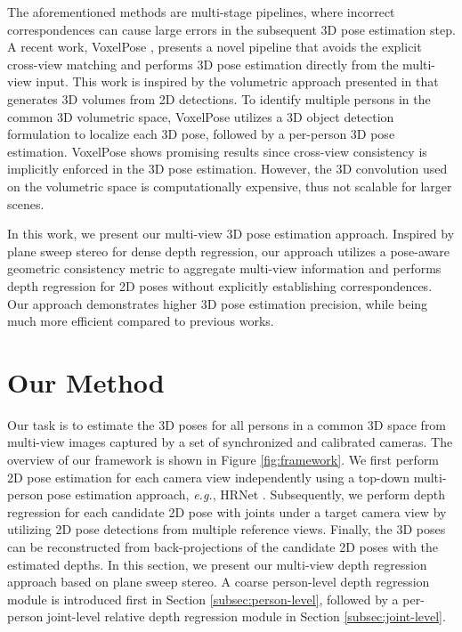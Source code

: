 \documentclass[final]{cvpr}
\begin{document}
The aforementioned methods are multi-stage pipelines, where incorrect correspondences can cause large errors in the subsequent 3D pose estimation step.
A recent work, VoxelPose \cite{tu2020voxelpose}, presents a novel pipeline that avoids the explicit cross-view matching and performs 3D pose estimation directly from the multi-view input. This work is inspired by the volumetric approach presented in \cite{iskakov2019learnable} that generates 3D volumes from 2D detections. To identify multiple persons in the common 3D volumetric space, VoxelPose utilizes a 3D object detection formulation to localize each 3D pose, followed by a per-person 3D pose estimation. VoxelPose shows promising results since cross-view consistency is implicitly enforced in the 3D pose estimation. However, the 3D convolution used on the volumetric space is computationally expensive, thus not scalable for larger scenes.

In this work, we present our multi-view 3D pose estimation approach.
Inspired by plane sweep stereo \cite{collins1996space,im2019dpsnet} for dense depth regression, our approach utilizes a pose-aware geometric consistency metric to aggregate multi-view information and performs depth regression for 2D poses without explicitly establishing correspondences.
Our approach demonstrates higher 3D pose estimation precision, while being much more efficient compared to previous works.


\section{Our Method}

Our task is to estimate the 3D poses for all persons in a common 3D space from multi-view images captured by a set of synchronized and calibrated cameras.
The overview of our framework is shown in Figure \ref{fig:framework}.
We first perform 2D pose estimation for each camera view independently using a top-down multi-person pose estimation approach, \textit{e.g.}, HRNet \cite{sun2019deep}.
Subsequently, we perform depth regression for each candidate 2D pose with  joints under a target camera view by utilizing 2D pose detections from multiple reference views.
Finally, the 3D poses can be reconstructed from back-projections of the candidate 2D poses with the estimated depths.
In this section, we present our multi-view depth regression approach based on plane sweep stereo.
A coarse person-level depth regression module is introduced first in Section \ref{subsec:person-level}, followed by a per-person joint-level relative depth regression module in Section \ref{subsec:joint-level}.
\end{document}

